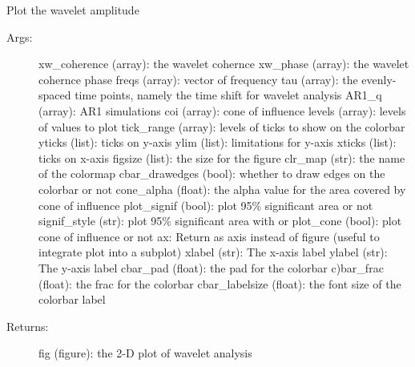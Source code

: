 \documentclass[letterpaper,10pt,english]{sphinxmanual}
\begin{document}
\begin{fulllineitems}
\label{\detokenize{Spectral:pyleoclim.Spectral.plot_coherence}}
Plot the wavelet amplitude
\begin{description}
\item[{Args:}] \leavevmode
xw\_coherence (array): the wavelet cohernce
xw\_phase (array): the wavelet cohernce phase
freqs (array): vector of frequency
tau (array): the evenly-spaced time points, namely the time shift for wavelet analysis
AR1\_q (array): AR1 simulations
coi (array): cone of influence
levels (array): levels of values to plot
tick\_range (array): levels of ticks to show on the colorbar
yticks (list): ticks on y-axis
ylim (list): limitations for y-axis
xticks (list): ticks on x-axis
figsize (list): the size for the figure
clr\_map (str): the name of the colormap
cbar\_drawedges (bool): whether to draw edges on the colorbar or not
cone\_alpha (float): the alpha value for the area covered by cone of influence
plot\_signif (bool): plot 95\% significant area or not
signif\_style (str): plot 95\% significant area with  or 
plot\_cone (bool): plot cone of influence or not
ax: Return as axis instead of figure (useful to integrate plot into a subplot)
xlabel (str): The x-axis label
ylabel (str): The y-axis label
cbar\_pad (float): the pad for the colorbar
c)bar\_frac (float): the frac for the colorbar
cbar\_labelsize (float): the font size of the colorbar label

\item[{Returns:}] \leavevmode
fig (figure): the 2-D plot of wavelet analysis

\end{description}

\end{fulllineitems}

\end{document}
